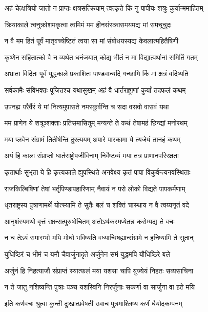 \twolineshloka
{अहं चेत्क्षत्रियो जातो न प्राप्तः क्षत्रसत्क्रियाम्}
{त्वत्कृते किं नु पापीयः शत्रुः कुर्यान्ममाहितम्}


\twolineshloka
{क्रियाकाले त्वनुक्रोशमकृत्वा त्वमिमं मम}
{हीनसंस्क्रासमयमद्य मां समचूचुदः}


\twolineshloka
{न वै मम हितं पूर्वं मातृवच्चेष्टितं त्वया}
{सा मां संबोधयस्यद्य केवलात्महितैषिणी}


\twolineshloka
{कृष्णेन सहितात्को वै न व्यथेत धनंजयात्}
{कोद्य भीतं न मां विद्यात्पर्थानां समितिं गतम्}


\twolineshloka
{अभ्राता विदितः पूर्वं युद्धकाले प्रकाशितः}
{पाण्डवान्यदि गच्छामि किं मां क्षत्रं वदिष्यति}


\twolineshloka
{सर्वकामैः संविभक्तः पूजितश्च यथासुखम्}
{अहं वै धार्तराष्ट्राणां कुर्यां तदफलं कथम्}


\twolineshloka
{उपनह्य परैर्वैरं ये मां नित्यमुपासते}
{नमस्कुर्वन्ति च सदा वसवो वासवं यथा}


\twolineshloka
{मम प्राणेन ये शत्रूञ्शक्ताः प्रतिसमासितुम्}
{मन्यन्ते ते कथं तेषामहं छिन्द्यां मनोरथम्}


\twolineshloka
{मया प्लवेन संग्रामं तितीर्षन्ति दुरत्ययम्}
{अपारे पारकामा ये त्यजेयं तानहं कथम्}


\twolineshloka
{अयं हि कालः संप्राप्तो धार्तराष्ट्रोपजीविनाम्}
{निर्वेष्टव्यं मया तत्र प्राणानपरिरक्षता}


\twolineshloka
{कृतार्थाः सुभृता ये हि कृत्यकाले ह्युपस्थिते}
{अनवेक्ष्य कृतं पापा विकुर्वन्त्यनवस्थिताः}


\threelineshloka
{राजकिल्बिषिणां तेषां भर्तृपिण्डापहारिणाम्}
{नैवायं न परो लोको विद्यते पापकर्मणाम्}
{}


\twolineshloka
{धृतराष्ट्रस्य पुत्राणामर्थे योत्स्यामि ते सुतैः}
{बलं च शक्तिं चास्थाय न वै त्वय्यनृतं वदे}


\twolineshloka
{आनृशंस्यमथो वृत्तं रक्षन्सत्पुरुषोचितम्}
{अतोऽर्थकरमप्येतन्न करोम्यद्य ते वचः}


\twolineshloka
{न च तेऽयं समारम्भो मयि मोघो भविष्यति}
{वध्यान्विषह्यान्संग्रामे न हनिष्यामि ते सुतान्}


\twolineshloka
{युधिष्ठिरं च भीमं च यमौ चैवार्जुनादृते}
{अर्जुनेन समं युद्धमपि यौधिष्ठिरे बले}


\twolineshloka
{अर्जुनं हि निहत्याजौ संप्राप्तं स्यात्फलं मया}
{यशसा चापि युज्येयं निहतः सव्यसाचिना}


\twolineshloka
{न ते जातु नशिष्यन्ति पुत्राः पञ्च यशस्विनि}
{निरर्जुनाः सकर्णा वा सार्जुना वा हते मयि}


\twolineshloka
{इति कर्णवचः श्रुत्वा कुन्ती दुःखात्प्रवेषती}
{उवाच पुत्रमाश्लिष्य कर्णं धैर्यादकम्पनम्}


